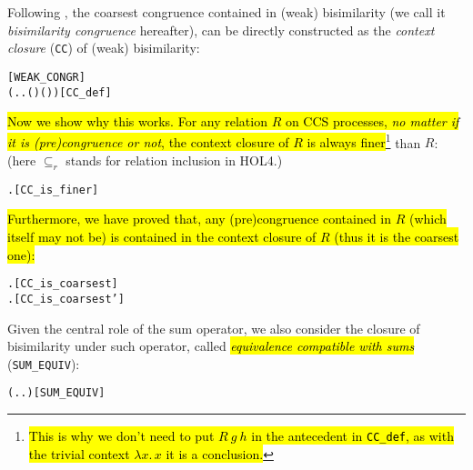 Following \cite{vanGlabbeek:2005ur}, the coarsest congruence
contained in (weak) bisimilarity (we call it \emph{bisimilarity
  congruence} hereafter), can be directly constructed as
the \emph{context closure} (\texttt{CC}) of (weak) bisimilarity:
\begin{alltt}
 \HOLSymConst{=}  \hfill{[WEAK_CONGR]}
  \HOLSymConst{=} (\HOLTokenLambda{} . \HOLSymConst{\HOLTokenForall{}}.   \HOLSymConst{\HOLTokenImp{}}  ( ) ( ))\hfill{[CC_def]}
\end{alltt}
\hl{Now we show why this works. For any relation $R$ 
on CCS processes, \emph{no matter if it is (pre)congruence or not},
the context closure of $R$ is always finer}\footnote{\hl{This is why
  we don't need to put $R\ g\ h$ in the antecedent in
\texttt{CC\_def}, as with the trivial context $\lambda x.\,x$ it is a conclusion.}} than
$R$: (here $\subseteq_r$ stands for relation inclusion in HOL4.)
\begin{alltt}
\HOLTokenTurnstile{} \HOLSymConst{\HOLTokenForall{}}.   \HOLSymConst{\HOLTokenRSubset{}} \hfill{[CC_is_finer]}
\end{alltt}
\hl{Furthermore, we have proved that, any (pre)congruence contained in $R$ (which
itself may not be) is contained in the context
closure of $R$ (thus it is the coarsest one):}
\begin{alltt}
\HOLTokenTurnstile{} \HOLSymConst{\HOLTokenForall{}} .   \HOLSymConst{\HOLTokenConj{}}  \HOLSymConst{\HOLTokenRSubset{}}  \HOLSymConst{\HOLTokenImp{}}  \HOLSymConst{\HOLTokenRSubset{}}  \hfill{[CC_is_coarsest]}
\HOLTokenTurnstile{} \HOLSymConst{\HOLTokenForall{}} .   \HOLSymConst{\HOLTokenConj{}}  \HOLSymConst{\HOLTokenRSubset{}}  \HOLSymConst{\HOLTokenImp{}}  \HOLSymConst{\HOLTokenRSubset{}}  \hfill{[CC_is_coarsest']}
\end{alltt}

Given the central role of the  
 sum operator, we also consider the closure of bisimilarity under such
 operator, called \hl{\emph{equivalence compatible with sums}}
(\texttt{SUM_EQUIV}): %
\begin{alltt}
 \HOLSymConst{=} (\HOLTokenLambda{} . \HOLSymConst{\HOLTokenForall{}}.  \HOLSymConst{+}  \HOLSymConst{\HOLTokenWeakEQ}  \HOLSymConst{+} )\hfill{[SUM_EQUIV]}
\end{alltt}


